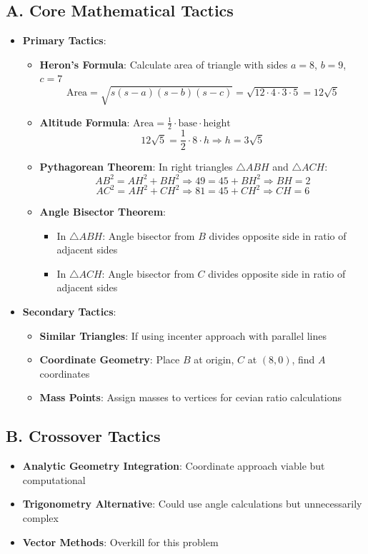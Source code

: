 \documentclass[12pt]{article}
\begin{document}
\begin{tacticalbox}
\subsection*{A. Core Mathematical Tactics}
\begin{itemize}[leftmargin=*]
    \item \textbf{Primary Tactics}:
    \begin{itemize}
        \item \textbf{Heron's Formula}: Calculate area of triangle with sides $a=8$, $b=9$, $c=7$
        $$\text{Area} = \sqrt{s(s-a)(s-b)(s-c)} = \sqrt{12 \cdot 4 \cdot 3 \cdot 5} = 12\sqrt{5}$$
        \item \textbf{Altitude Formula}: $\text{Area} = \frac{1}{2} \cdot \text{base} \cdot \text{height}$
        $$12\sqrt{5} = \frac{1}{2} \cdot 8 \cdot h \Rightarrow h = 3\sqrt{5}$$
        \item \textbf{Pythagorean Theorem}: In right triangles $\triangle ABH$ and $\triangle ACH$:
        $$AB^2 = AH^2 + BH^2 \Rightarrow 49 = 45 + BH^2 \Rightarrow BH = 2$$
        $$AC^2 = AH^2 + CH^2 \Rightarrow 81 = 45 + CH^2 \Rightarrow CH = 6$$
        \item \textbf{Angle Bisector Theorem}: 
        \begin{itemize}
            \item In $\triangle ABH$: Angle bisector from $B$ divides opposite side in ratio of adjacent sides
            \item In $\triangle ACH$: Angle bisector from $C$ divides opposite side in ratio of adjacent sides
        \end{itemize}
    \end{itemize}
    \item \textbf{Secondary Tactics}:
    \begin{itemize}
        \item \textbf{Similar Triangles}: If using incenter approach with parallel lines
        \item \textbf{Coordinate Geometry}: Place $B$ at origin, $C$ at $(8,0)$, find $A$ coordinates
        \item \textbf{Mass Points}: Assign masses to vertices for cevian ratio calculations
    \end{itemize}
\end{itemize}

\subsection*{B. Crossover Tactics}
\begin{itemize}[leftmargin=*]
    \item \textbf{Analytic Geometry Integration}: Coordinate approach viable but computational
    \item \textbf{Trigonometry Alternative}: Could use angle calculations but unnecessarily complex
    \item \textbf{Vector Methods}: Overkill for this problem
\end{itemize}
\end{tacticalbox}
\end{document}
